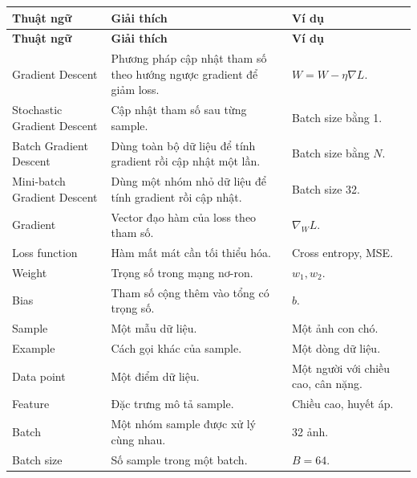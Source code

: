 \small
\begin{longtable}{p{}p{}p{}}
\toprule
\textbf{Thuật ngữ} & \textbf{Giải thích} & \textbf{Ví dụ} \\
\midrule
\endfirsthead

\toprule
\textbf{Thuật ngữ} & \textbf{Giải thích} & \textbf{Ví dụ} \\
\midrule
\endhead

Gradient Descent & Phương pháp cập nhật tham số theo hướng ngược gradient để giảm loss. & $W=W-\eta\nabla L$. \\

Stochastic Gradient Descent & Cập nhật tham số sau từng sample. & Batch size bằng 1. \\

Batch Gradient Descent & Dùng toàn bộ dữ liệu để tính gradient rồi cập nhật một lần. & Batch size bằng $N$. \\

Mini-batch Gradient Descent & Dùng một nhóm nhỏ dữ liệu để tính gradient rồi cập nhật. & Batch size 32. \\

Gradient & Vector đạo hàm của loss theo tham số. & $\nabla_W L$. \\

Loss function & Hàm mất mát cần tối thiểu hóa. & Cross entropy, MSE. \\

Weight & Trọng số trong mạng nơ-ron. & $w_1,w_2$. \\

Bias & Tham số cộng thêm vào tổng có trọng số. & $b$. \\

Sample & Một mẫu dữ liệu. & Một ảnh con chó. \\

Example & Cách gọi khác của sample. & Một dòng dữ liệu. \\

Data point & Một điểm dữ liệu. & Một người với chiều cao, cân nặng. \\

Feature & Đặc trưng mô tả sample. & Chiều cao, huyết áp. \\

Batch & Một nhóm sample được xử lý cùng nhau. & 32 ảnh. \\

Batch size & Số sample trong một batch. & $B=64$. \\


\end{longtable}
